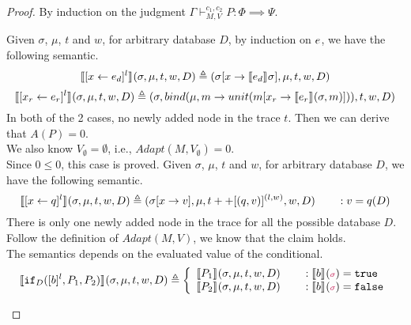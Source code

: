 \documentclass[a4paper,11pt]{article}
\begin{document}
\begin{proof}
 By induction on the judgment $\Gamma \vdash_{M,V}^{c_1, c_2} P: \Phi \implies \Psi$.
\\ 
\begin{itemize}
%
%
Given $\sigma$, $\mu$,
$t$ and $w$,
for arbitrary database $D$, by induction on $e$, we have the following semantic.
\[ 
  \llbracket [\mathrel{ x \leftarrow e }_d]^{l} \rrbracket_{} (\sigma, \mu , t, w, D)   
  \triangleq  (\sigma[x \to \llbracket e_d\rrbracket_{} \sigma ], \mu ,  t, w , D) 
\]
%
%
\[
\llbracket [\mathrel{ x_r \leftarrow e_r }]^{l}\rrbracket_{} (\sigma, \mu , t, w, D)  
\triangleq 
(\sigma, bind(\mu , m \to unit(m[x_r \to \llbracket e_r\rrbracket_{}(\sigma, m)]) ) , t, w , D ) 
\]
%
In both of the 2 cases, no newly added node in the trace $t$. Then we can derive that $A(P) = 0$.
\\
We also know $V_{\emptyset} = \emptyset$, i.e., $Adapt(M, V_{\emptyset}) = 0$.
\\
Since $0 \leq 0$, this case is proved.
%
%
Given $\sigma$, $\mu$,  $t$ and $w$, for arbitrary database $D$, we have the following semantic.
\[ 
  \llbracket [\mathrel{ x \leftarrow q }]^{l} \rrbracket_{} (\sigma, \mu , t, w, D)   
  \triangleq  (\sigma[x \to v ], \mu ,  t ++ [(q, v)]^{(l, w)}, w , D) \qquad : v = q(D)
\]
There is only one newly added node in the trace for all the possible database $D$. 
Follow the definition of $Adapt(M,V)$, we know that the claim holds.\\
The semantics depends on the evaluated value of the conditional.
\[
\lrr{ \eif_D ([\bexpr]^{l}, P_1, P_2)  }{} (\sigma, \mu , t, w , D)   \triangleq  \left \{  \begin{array}{l} 
         \lrr{P_1}{} (\sigma, \mu , t, w , D) 
         \qquad : \lrr{\bexpr}{}(\jl{\sigma}) = \etrue \\ 
         \lrr{P_2}{} (\sigma, \mu , t, w ,D) 
         \qquad : \lrr{\bexpr}{}(\jl{\sigma}) = \efalse 
         \end{array} \right . \\  
\]
\end{itemize}
\end{proof}
\end{document}
